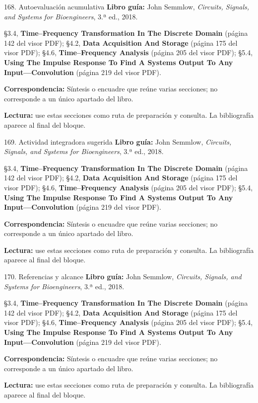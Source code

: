 \documentclass[
  10pt,
  ignorenonframetext,
  aspectratio=169,
  spanish,
]{beamer}
\begin{document}
\begin{frame}{168. Autoevaluación acumulativa}
\label{autoevaluaciuxf3n-acumulativa-1}
\textbf{Libro guía:} John Semmlow, \emph{Circuits, Signals, and Systems
for Bioengineers}, 3.ª ed., 2018.

§3.4, \textbf{Time--Frequency Transformation In The Discrete Domain}
(página 142 del visor PDF); §4.2, \textbf{Data Acquisition And Storage}
(página 175 del visor PDF); §4.6, \textbf{Time--Frequency Analysis}
(página 205 del visor PDF); §5.4, \textbf{Using The Impulse Response To
Find A Systems Output To Any Input---Convolution} (página 219 del visor
PDF).

\textbf{Correspondencia:} Síntesis o encuadre que reúne varias
secciones; no corresponde a un único apartado del libro.

\textbf{Lectura:} use estas secciones como ruta de preparación y
consulta. La bibliografía aparece al final del bloque.
\end{frame}

\begin{frame}{169. Actividad integradora sugerida}
\label{actividad-integradora-sugerida-1}
\textbf{Libro guía:} John Semmlow, \emph{Circuits, Signals, and Systems
for Bioengineers}, 3.ª ed., 2018.

§3.4, \textbf{Time--Frequency Transformation In The Discrete Domain}
(página 142 del visor PDF); §4.2, \textbf{Data Acquisition And Storage}
(página 175 del visor PDF); §4.6, \textbf{Time--Frequency Analysis}
(página 205 del visor PDF); §5.4, \textbf{Using The Impulse Response To
Find A Systems Output To Any Input---Convolution} (página 219 del visor
PDF).

\textbf{Correspondencia:} Síntesis o encuadre que reúne varias
secciones; no corresponde a un único apartado del libro.

\textbf{Lectura:} use estas secciones como ruta de preparación y
consulta. La bibliografía aparece al final del bloque.
\end{frame}

\begin{frame}{170. Referencias y alcance}
\label{referencias-y-alcance-1}
\textbf{Libro guía:} John Semmlow, \emph{Circuits, Signals, and Systems
for Bioengineers}, 3.ª ed., 2018.

§3.4, \textbf{Time--Frequency Transformation In The Discrete Domain}
(página 142 del visor PDF); §4.2, \textbf{Data Acquisition And Storage}
(página 175 del visor PDF); §4.6, \textbf{Time--Frequency Analysis}
(página 205 del visor PDF); §5.4, \textbf{Using The Impulse Response To
Find A Systems Output To Any Input---Convolution} (página 219 del visor
PDF).

\textbf{Correspondencia:} Síntesis o encuadre que reúne varias
secciones; no corresponde a un único apartado del libro.

\textbf{Lectura:} use estas secciones como ruta de preparación y
consulta. La bibliografía aparece al final del bloque.
\end{frame}
\end{document}
